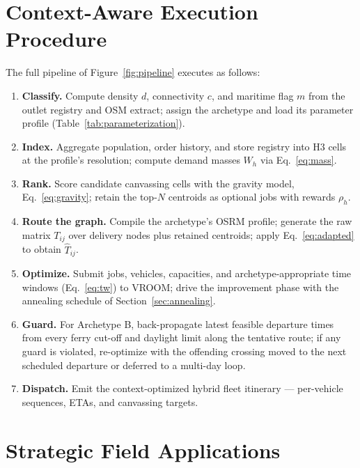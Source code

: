 \documentclass[11pt,a4paper,twocolumn]{article}
\begin{document}
\section{Context-Aware Execution Procedure}
\label{sec:procedure}

The full pipeline of Figure~\ref{fig:pipeline} executes as follows:

\begin{enumerate}[leftmargin=1.5em, itemsep=0.2em]
  \item \textbf{Classify.} Compute density $d$, connectivity $c$, and
    maritime flag $m$ from the outlet registry and OSM extract; assign the
    archetype and load its parameter profile
    (Table~\ref{tab:parameterization}).
  \item \textbf{Index.} Aggregate population, order history, and store
    registry into H3 cells at the profile's resolution; compute demand
    masses $W_h$ via Eq.~\eqref{eq:mass}.
  \item \textbf{Rank.} Score candidate canvassing cells with the gravity
    model, Eq.~\eqref{eq:gravity}; retain the top-$N$ centroids as
    optional jobs with rewards $\rho_h$.
  \item \textbf{Route the graph.} Compile the archetype's OSRM profile;
    generate the raw matrix $T_{ij}$ over delivery nodes plus retained
    centroids; apply Eq.~\eqref{eq:adapted} to obtain
    $\widehat{T}_{ij}$.
  \item \textbf{Optimize.} Submit jobs, vehicles, capacities, and
    archetype-appropriate time windows (Eq.~\eqref{eq:tw}) to VROOM;
    drive the improvement phase with the annealing schedule of
    Section~\ref{sec:annealing}.
  \item \textbf{Guard.} For Archetype B, back-propagate latest feasible
    departure times from every ferry cut-off and daylight limit along the
    tentative route; if any guard is violated, re-optimize with the
    offending crossing moved to the next scheduled departure or deferred
    to a multi-day loop.
  \item \textbf{Dispatch.} Emit the context-optimized hybrid fleet
    itinerary --- per-vehicle sequences, ETAs, and canvassing targets.
\end{enumerate}

\section{Strategic Field Applications}
\label{sec:applications}
\end{document}
